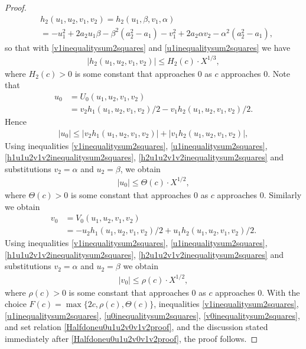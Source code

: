 \documentclass[10pt,a4paper]{amsart}
\begin{document}
\begin{proof}
\begin{align*}
&h_{2}(u_{1},u_{2}, v_{1},v_{2}) = h_{2}(u_{1},\beta, v_{1},\alpha)\\
&= -u_{1}^2+2a_{2}u_{1}\beta-\beta^2(a_{2}^2-a_{1}) -v_{1}^2+2a_{2}\alpha v_{2}-\alpha^2(a_{2}^2-a_{1}),
\end{align*}
so that with \eqref{v1inequalitysum2squares} and \eqref{u1inequalitysum2squares} we have
\begin{align}
\label{h2u1u2v1v2inequalitysum2squares}
|h_{2}(u_{1},u_{2}, v_{1},v_{2})| \leq H_{2}(c)\cdot X^{1/3},
\end{align}
where $H_{2}(c)>0$ is some constant that approaches $0$ as $c$ approaches $0$. Note that 
\begin{align*}
u_{0} &= U_{0}(u_{1},u_{2},v_{1},v_{2}) \\
&= v_{2} h_{1}(u_{1},u_{2},v_{1},v_{2})/2 - v_{1} h_{2}(u_{1},u_{2},v_{1},v_{2})/2.
\end{align*}
Hence
\begin{align*}
|u_{0}| \leq |v_{2} h_{1}(u_{1},u_{2},v_{1},v_{2})| +|v_{1} h_{2}(u_{1},u_{2},v_{1},v_{2})|,
\end{align*}
Using inequalities \eqref{v1inequalitysum2squares}, \eqref{u1inequalitysum2squares}, \eqref{h1u1u2v1v2inequalitysum2squares}, \eqref{h2u1u2v1v2inequalitysum2squares} and substitutions $v_{2} = \alpha$ and $u_{2} = \beta$, we obtain 
\begin{align}
\label{u0inequalitysum2squares}
|u_{0}| \leq \Theta(c)\cdot X^{1/2},
\end{align}
where $\Theta(c)>0$ is some constant that approaches $0$ as $c$ approaches $0$. Similarly we obtain
\begin{align*}
v_{0} &= V_{0}(u_{1},u_{2},v_{1},v_{2})\\
&= -u_{2} h_{1}(u_{1},u_{2},v_{1},v_{2})/2 +u_{1}h_{2}(u_{1},u_{2},v_{1},v_{2})/2.
\end{align*}
Using inequalities \eqref{v1inequalitysum2squares}, \eqref{u1inequalitysum2squares}, \eqref{h1u1u2v1v2inequalitysum2squares}, \eqref{h2u1u2v1v2inequalitysum2squares} and substitutions $v_{2} = \alpha$ and $u_{2} = \beta$ we obtain
\begin{align}
\label{v0inequalitysum2squares}
|v_{0}| \leq \rho(c)\cdot X^{1/2},
\end{align}
where $\rho(c)>0$ is some constant that approaches $0$ as $c$ approaches $0$. With the choice $F(c) = \max\{2c,\rho(c),\Theta(c)\}$, inequalities \eqref{v1inequalitysum2squares}, \eqref{u1inequalitysum2squares}, \eqref{u0inequalitysum2squares}, \eqref{v0inequalitysum2squares}, and set relation \eqref{Halfdoneu0u1u2v0v1v2proof}, and the discussion stated immediately after \eqref{Halfdoneu0u1u2v0v1v2proof}, the proof follows.
\end{proof}
\end{document}
